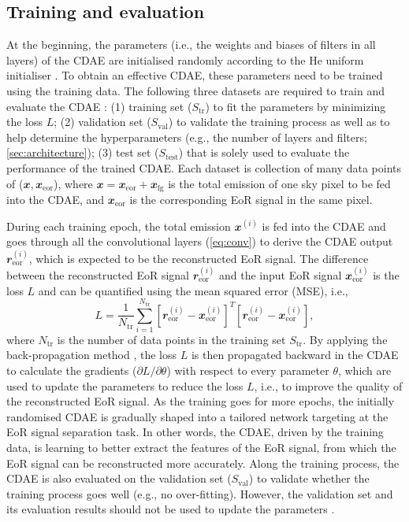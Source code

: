 \documentclass[fleqn,usenatbib]{mnras}
\newcommand{\R}[1]{\mathrm{#1}}
\newcommand{\B}[1]{\mathbfit{#1}}
\newcommand{\editone}[1]{{\leavevmode\color{cyan}#1}}
\begin{document}
\subsection{Training and evaluation}
\label{sec:train-eval}

\editone{%
At the beginning, the parameters (i.e., the weights and biases of filters
in all layers) of the CDAE are initialised randomly according to the He
uniform initialiser \citep{he2015}.
To obtain an effective CDAE, these parameters need to be trained using the
training data.
The following three datasets are required to train and evaluate the CDAE
\citep[e.g.,][]{ripley1996}:
(1) training set ($S_{\R{tr}}$) to fit the parameters by minimizing the
loss $L$;
(2) validation set ($S_{\R{val}}$) to validate the training process as well
as to help determine the hyperparameters (e.g., the number of layers and
filters; \autoref{sec:architecture});
(3) test set ($S_{\R{test}}$) that is solely used to evaluate the
performance of the trained CDAE.
Each dataset is collection of many data points of
($\B{x}, \B{x}_{\R{eor}}$),
where $\B{x} = \B{x}_{\R{eor}} + \B{x}_{\R{fg}}$ is the total emission of
one sky pixel to be fed into the CDAE, and $\B{x}_{\R{eor}}$ is the
corresponding EoR signal in the same pixel.

During each training epoch, the total emission $\B{x}^{(i)}$ is fed into
the CDAE and goes through all the convolutional layers (\autoref{eq:conv})
to derive the CDAE output $\B{r}^{(i)}_{\R{eor}}$, which is expected to be
the reconstructed EoR signal.
The difference between the reconstructed EoR signal $\B{r}^{(i)}_{\R{eor}}$
and the input EoR signal $\B{x}^{(i)}_{\R{eor}}$ is the loss $L$ and can be
quantified using the mean squared error (MSE), i.e.,
\begin{equation}
  \label{eq:loss}
  L = \frac{1}{N_{\R{tr}}} \sum_{i=1}^{N_{\R{tr}}}
    \left[ \B{r}_{\R{eor}}^{(i)} - \B{x}_{\R{eor}}^{(i)} \right]^T
    \left[ \B{r}_{\R{eor}}^{(i)} - \B{x}_{\R{eor}}^{(i)} \right],
\end{equation}
where $N_{\R{tr}}$ is the number of data points in the training set
$S_{\R{tr}}$.
By applying the back-propagation method
\citep[e.g.,][]{rumelhart1986,lecun1998bp},
the loss $L$ is then propagated backward in the CDAE to calculate the
gradients ($\partial L / \partial \theta$) with respect to every parameter
$\theta$, which are used to update the parameters to reduce the loss $L$,
i.e., to improve the quality of the reconstructed EoR signal.
As the training goes for more epochs, the initially randomised CDAE is
gradually shaped into a tailored network targeting at the EoR signal
separation task.
In other words, the CDAE, driven by the training data, is learning to
better extract the features of the EoR signal, from which the EoR signal
can be reconstructed more accurately.
Along the training process, the CDAE is also evaluated on the validation
set ($S_{\R{val}}$) to validate whether the training process goes well
(e.g., no over-fitting).
However, the validation set and its evaluation results should not be used
to update the parameters \citep[e.g.,][]{russell2009}.
} %
\end{document}

